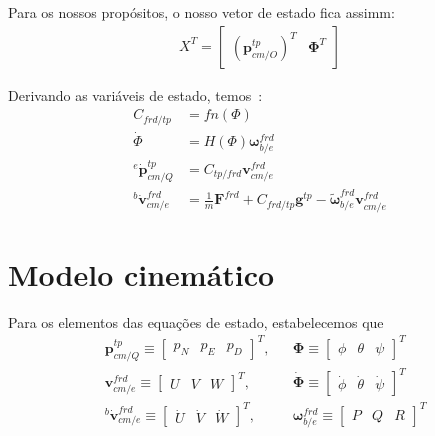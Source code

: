 Para os nossos propósitos, o nosso vetor de estado fica assimm:
\begin{align}\label{eq:1.7-17}
    {X}^{T} = \begin{bmatrix} {\left( \mathbf{p}^{tp}_{cm/O} \right)}^{T} & \mathbf{\Phi}^{T} \end{bmatrix}
\end{align}

Derivando as variáveis de estado\footnotemark{}, temos~\cite{Stevens2016}:
\begin{align}\label{eq:1.7-18}
    C_{frd/tp} &= fn \left( \Phi \right) \\
    \dot{\Phi} &=  H \left( \Phi \right) {\mathbf{\omega}^{frd}_{b/e}} \\
    {^{e}{\dot{\mathbf{p}}^{tp}_{cm/Q}}} &= {C_{tp/frd}}{\mathbf{v}^{frd}_{cm/e}} \\
    {^{b}{\dot{\mathbf{v}}^{frd}_{cm/e}}} &= \textstyle{\frac{1}{m}} {\mathbf{F}^{frd}} + {C_{frd/tp}}{\mathbf{g}^{tp}} - {\tilde{\mathbf{\omega}}^{frd}_{b/e}} {\mathbf{v}^{frd}_{cm/e}}
\end{align}

\section{Modelo cinemático}

Para os elementos das equações de estado, estabelecemos que
\begin{align*}
    &\mathbf{p}^{tp}_{cm/Q} \equiv \begin{bmatrix} p_{N} & p_{E} & p_{D} \end{bmatrix}^{T},&
    &\mathbf{\Phi} \equiv \begin{bmatrix} \phi & \theta & \psi \end{bmatrix}^{T} \\
    &\mathbf{v}^{frd}_{cm/e} \equiv \begin{bmatrix} U & V & W \end{bmatrix}^{T},&
    &{\dot{\mathbf{\Phi}}} \equiv \begin{bmatrix} \dot{\phi} & \dot{\theta} & \dot{\psi} \end{bmatrix}^{T} \\
    &{^{b}{\dot{\mathbf{v}}}^{frd}_{cm/e}} \equiv \begin{bmatrix} {\dot{U}} & {\dot{V}} & {\dot{W}} \end{bmatrix}^{T}, &
    &\mathbf{\omega}^{frd}_{b/e} \equiv \begin{bmatrix} P & Q & R \end{bmatrix}^{T}
\end{align*}

